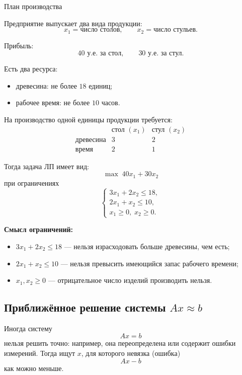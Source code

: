	\begin{Example}{План производства}{}
	
	Предприятие выпускает два вида продукции:
	\[
	x_1 = \text{число столов}, \qquad x_2 = \text{число стульев}.
	\]
	
	Прибыль:
	\[
	40 \text{ у.е. за стол}, \qquad 30 \text{ у.е. за стул}.
	\]
	
	Есть два ресурса:
	\begin{itemize}
		\item древесина: не более \(18\) единиц;
		\item рабочее время: не более \(10\) часов.
	\end{itemize}
	
	На производство одной единицы продукции требуется:
	\[
	\begin{array}{c|cc}
		& \text{стол } (x_1) & \text{стул } (x_2)\\
		\hline
		\text{древесина} & 3 & 2\\
		\text{время} & 2 & 1
	\end{array}
	\]
	
	Тогда задача ЛП имеет вид:
	\[
	\max \; 40x_1 + 30x_2
	\]
	при ограничениях
	\[
	\begin{cases}
		3x_1 + 2x_2 \le 18,\\
		2x_1 + x_2 \le 10,\\
		x_1 \ge 0,\; x_2 \ge 0.
	\end{cases}
	\]
	
	\textbf{Смысл ограничений:}
	\begin{itemize}
		\item \(3x_1+2x_2 \le 18\) --- нельзя израсходовать больше древесины, чем есть;
		\item \(2x_1+x_2 \le 10\) --- нельзя превысить имеющийся запас рабочего времени;
		\item \(x_1,x_2 \ge 0\) --- отрицательное число изделий производить нельзя.
	\end{itemize}
	\end{Example}
	
	\subsection{Приближённое решение системы \texorpdfstring{$Ax \approx b$}{Ax ≈ b}}
	
	Иногда систему
	\[
	Ax=b
	\]
	нельзя решить точно: например, она переопределена или содержит ошибки измерений. Тогда ищут \(x\), для которого невязка (ошибка)
	\[
	Ax-b
	\]
	как можно меньше.
	
